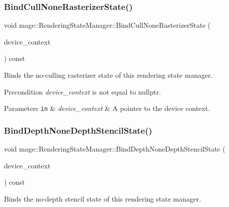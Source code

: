 \subsubsection{\texorpdfstring{Bind\+Cull\+None\+Rasterizer\+State()}{BindCullNoneRasterizerState()}}
{\footnotesize\ttfamily void mage\+::\+Rendering\+State\+Manager\+::\+Bind\+Cull\+None\+Rasterizer\+State (\begin{DoxyParamCaption}\item[{I\+D3\+D11\+Device\+Context2 $\ast$}]{device\+\_\+context }\end{DoxyParamCaption}) const\hspace{0.3cm}{\ttfamily [noexcept]}}

Binds the no-\/culling rasterizer state of this rendering state manager.

\begin{DoxyPrecond}{Precondition}
{\itshape device\+\_\+context} is not equal to {\ttfamily nullptr}. 
\end{DoxyPrecond}

\begin{DoxyParams}[1]{Parameters}
\mbox{\tt in}  & {\em device\+\_\+context} & A pointer to the device context. \\
\hline
\end{DoxyParams}
\hypertarget{classmage_1_1_rendering_state_manager_aeb15352ab4fbfdc8ec08055e880a524d}{}\label{classmage_1_1_rendering_state_manager_aeb15352ab4fbfdc8ec08055e880a524d} 
\subsubsection{\texorpdfstring{Bind\+Depth\+None\+Depth\+Stencil\+State()}{BindDepthNoneDepthStencilState()}}
{\footnotesize\ttfamily void mage\+::\+Rendering\+State\+Manager\+::\+Bind\+Depth\+None\+Depth\+Stencil\+State (\begin{DoxyParamCaption}\item[{I\+D3\+D11\+Device\+Context2 $\ast$}]{device\+\_\+context }\end{DoxyParamCaption}) const\hspace{0.3cm}{\ttfamily [noexcept]}}

Binds the no-\/depth stencil state of this rendering state manager.

